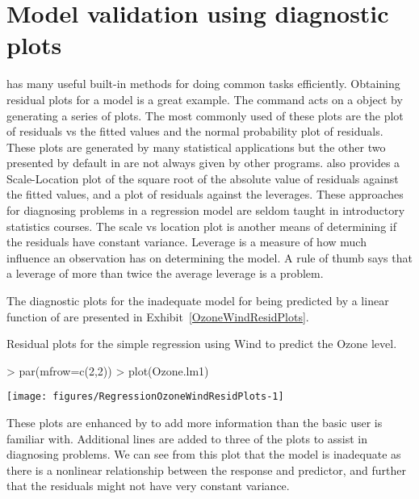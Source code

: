 \section{Model validation using diagnostic plots} 
\label{RegValid}  
 
\R{} has many useful built-in methods for doing common tasks efficiently. Obtaining residual plots for a model is a great example. The  command acts on a  object by generating a series of plots. The most commonly used of these plots are the plot of residuals vs the fitted values and the normal probability plot of residuals. These plots are generated by many statistical applications but the other two presented by default in \R{} are not always given by other programs. 
\R{} also provides a Scale-Location plot of the square root of the absolute value of residuals against the fitted values, and a plot of residuals against the leverages. These approaches for diagnosing problems in a regression model are seldom taught in introductory statistics courses.  
The scale vs location plot is another means of determining if the residuals have constant variance. Leverage is a measure of how much influence an observation has on determining the model. A rule of thumb says that a leverage of more than twice the average leverage is a problem. 
 
The diagnostic plots for the inadequate model for  being predicted by a linear function of  are presented in Exhibit~\ref{OzoneWindResidPlots}. 
\begin{exhibit} 
\begin{center} 
\caption{Residual plots for the simple regression using Wind to predict the Ozone level.} 
\label{OzoneWindResidPlots} 

\begin{Schunk}
\begin{Sinput}
> par(mfrow=c(2,2)) 
> plot(Ozone.lm1) 
\end{Sinput}

\texttt{[image: figures/RegressionOzoneWindResidPlots-1]} \end{Schunk}

\end{center} 
\end{exhibit} 
These plots are enhanced by \R{} to add more information than the basic user is familiar with. Additional lines are added to three of the plots to assist in diagnosing problems. We can see from this plot that the model is inadequate as there is a nonlinear relationship between the response and predictor, and further that the residuals might not have very constant variance. 

